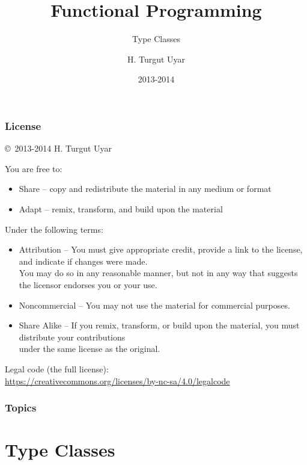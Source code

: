 \documentclass[dvipsnames]{beamer}
\title{Functional Programming}
\subtitle{Type Classes}
\author{H. Turgut Uyar}
\date{2013-2014}
\theoremstyle{plain}
\begin{document}

\begin{frame}
  \titlepage
\end{frame}

\begin{frame}
  \frametitle{License}

  \hfill
  \copyright~2013-2014 H. Turgut Uyar

  \vfill
  \begin{tiny}
    You are free to:
    \begin{itemize}
      \item Share -- copy and redistribute the material in any medium or format
      \item Adapt -- remix, transform, and build upon the material
    \end{itemize}

    Under the following terms:
    \begin{itemize}
      \item Attribution -- You must give appropriate credit, provide a link to
        the license, and indicate if changes were made.\\
        You may do so in any reasonable manner, but not in any way
        that suggests the licensor endorses you or your use.

      \item Noncommercial -- You may not use the material for commercial
        purposes.

      \item Share Alike -- If you remix, transform, or build upon the material,
        you must distribute your contributions\\
        under the same license as the original.
    \end{itemize}
  \end{tiny}

  \vfill
  \begin{small}
    Legal code (the full license):\\
    \url{https://creativecommons.org/licenses/by-nc-sa/4.0/legalcode}
  \end{small}
\end{frame}

\begin{frame}
  \frametitle{Topics}
  \tableofcontents
\end{frame}

\section{Type Classes}
\end{document}
